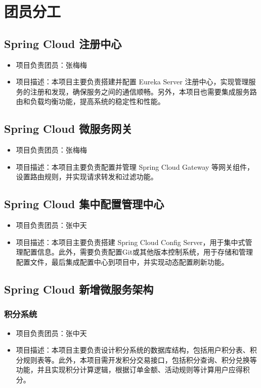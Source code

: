 \chapter{团员分工}
\section{Spring Cloud 注册中心}
\begin{itemize}
    \item{项目负责团员}：张梅梅
    \item {项目描述}：本项目主要负责搭建并配置 Eureka Server 注册中心，实现管理服务的注册和发现，确保服务之间的通信顺畅。另外，本项目也需要集成服务路由和负载均衡功能，提高系统的稳定性和性能。
\end{itemize}

\section{Spring Cloud 微服务网关}
\begin{itemize}
    \item{项目负责团员}：张梅梅
    \item {项目描述}：本项目主要负责配置并管理 Spring Cloud Gateway 等网关组件，设置路由规则，并实现请求转发和过滤功能。
\end{itemize}

\section{Spring Cloud 集中配置管理中心}
\begin{itemize}
    \item{项目负责团员}：张中天
    \item {项目描述}：本项目主要负责搭建 Spring Cloud Config Server，用于集中式管理配置信息。此外，需要负责配置Git或其他版本控制系统，用于存储和管理配置文件，最后集成配置中心到项目中，并实现动态配置刷新功能。
\end{itemize}

\section{Spring Cloud 新增微服务架构}
\subsection{积分系统}
\begin{itemize}
    \item{项目负责团员}：张中天
    \item {项目描述}：本项目主要负责设计积分系统的数据库结构，包括用户积分表、积分规则表等。此外，本项目需开发积分交易接口，包括积分查询、积分兑换等功能，并且实现积分计算逻辑，根据订单金额、活动规则等计算用户应得积分。
\end{itemize}

